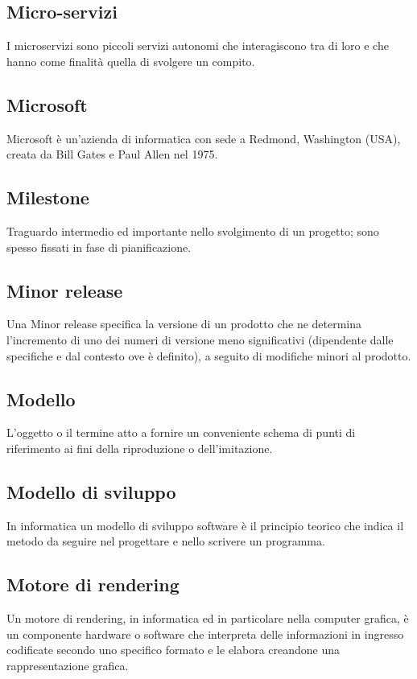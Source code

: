 \subsection*{Micro-servizi}
I microservizi sono piccoli servizi autonomi che interagiscono tra di loro e che hanno come finalità quella di svolgere un compito.

\subsection*{Microsoft}
Microsoft è un'azienda di informatica con sede a Redmond, Washington (USA), creata da Bill Gates e Paul Allen nel 1975.

\subsection*{Milestone}
Traguardo intermedio ed importante nello svolgimento di un progetto; sono spesso fissati in fase di pianificazione.

\subsection*{Minor release}
Una Minor release specifica la versione di un prodotto che ne determina l’incremento di uno dei numeri di versione meno significativi (dipendente dalle specifiche e dal contesto ove è definito), a seguito di modifiche minori al prodotto.

\subsection*{Modello}
L'oggetto o il termine atto a fornire un conveniente schema di punti di riferimento ai fini della riproduzione o dell'imitazione.

\subsection*{Modello di sviluppo}
In informatica un modello di sviluppo software è il principio teorico che indica il metodo da seguire nel progettare e nello scrivere un programma.

\subsection*{Motore di rendering}
Un motore di rendering, in informatica ed in particolare nella computer grafica, è un componente hardware o software che interpreta delle informazioni in ingresso codificate secondo uno specifico formato e le elabora creandone una rappresentazione grafica.

